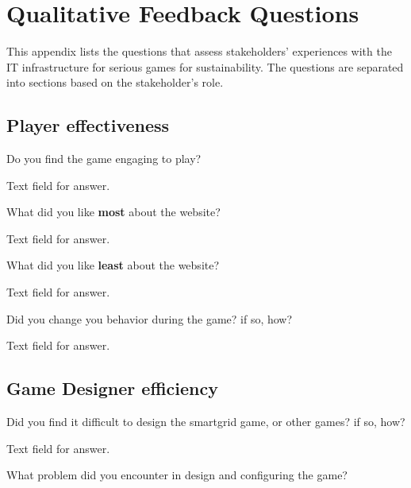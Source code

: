 \chapter{Qualitative Feedback Questions}
\label{app:qualitative-feedback}

This appendix lists the questions that assess stakeholders' experiences with the IT infrastructure for serious games for sustainability. The questions are separated into sections based on the stakeholder's role.

\section{Player effectiveness}

\begin{question}
	\item Do you find the game engaging to play?
\end{question}

Text field for answer.

\begin{question}
	\item What did you like \textbf{most} about the website?
\end{question}

Text field for answer.

\begin{question}
	\item What did you like \textbf{least} about the website?
\end{question}

Text field for answer.

\begin{question}
	\item Did you change you behavior during the game? if so, how?
\end{question}

Text field for answer.

\section{Game Designer efficiency}

\begin{question}
	\item Did you find it difficult to design the smartgrid game, or other games? if so, how?
\end{question}

Text field for answer.

\begin{question}
    \item What problem did you encounter in design and configuring the game?
\end{question}


